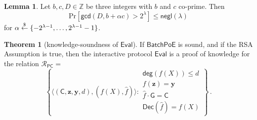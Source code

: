 \documentclass{article}
\theoremstyle{definition}
\newtheorem{theorem}{Theorem}
\newtheorem{lemma}{Lemma}
\begin{document}
\begin{lemma} \label{lemma:gcd_distribution}
Let $b, c, D \in \mathbb{Z}$ be three integers with $b$ and $c$ co-prime. Then
$$ \mathrm{Pr}[\mathsf{gcd}(D, b + \alpha c) > 2^\lambda] \leq \mathsf{negl}(\lambda) $$
for $\alpha \overset{\$}{\gets} \{-2^{\lambda-1}, \ldots, 2^{\lambda - 1} - 1 \}$.
\end{lemma}

\begin{theorem}[knowledge-soundness of $\mathsf{Eval}$]
If $\mathsf{BatchPoE}$ is sound, and if the RSA Assumption is true, then the interactive protocol $\mathsf{Eval}$ is a proof of knowledge for the relation $\mathcal{R}_{\mathsf{PC}} =$
$$ \left\{ \langle (\mathsf{C}, \mathbf{z}, \mathbf{y}, d), (f(X), \hat{f})\rangle : \begin{array}{l}
\mathsf{deg}(f(X)) \leq d \\
f(\mathbf{z}) = \mathbf{y} \\
\hat{f} \cdot \mathsf{G} = \mathsf{C} \\
\mathsf{Dec}(\hat{f}) = f(X)
\end{array} \right\} \, .$$
\end{theorem}
\end{document}
